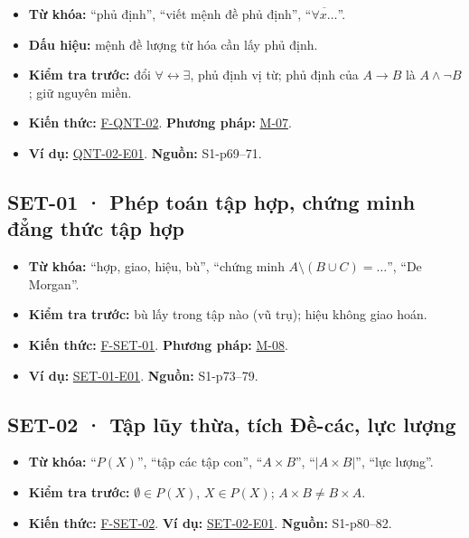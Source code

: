 \documentclass[
  10pt,
  twoside,openany]{book}
\providecommand{\tightlist}{%
  \setlength{\itemsep}{0pt}\setlength{\parskip}{0pt}}
\begin{document}
\begin{itemize}
\tightlist
\item
  \textbf{Từ khóa:} ``phủ định'', ``viết mệnh đề phủ định'',
  ``\(\overline{\forall x\dots}\)''.
\item
  \textbf{Dấu hiệu:} mệnh đề lượng từ hóa cần lấy phủ định.
\item
  \textbf{Kiểm tra trước:} đổi \(\forall\leftrightarrow\exists\), phủ
  định vị từ; phủ định của \(A\to B\) là \(A\wedge\neg B\); giữ nguyên
  miền.
\item
  \textbf{Kiến thức:} \protect\hyperlink{F-QNT-02}{F-QNT-02}.
  \textbf{Phương pháp:} \protect\hyperlink{M-07}{M-07}.
\item
  \textbf{Ví dụ:} \protect\hyperlink{QNT-02-E01}{QNT-02-E01}.
  \textbf{Nguồn:} S1-p69--71.
\end{itemize}

\hypertarget{SET-01}{%
\subsection{SET-01 · Phép toán tập hợp, chứng minh đẳng thức tập
hợp}\label{SET-01}}

\begin{itemize}
\tightlist
\item
  \textbf{Từ khóa:} ``hợp, giao, hiệu, bù'', ``chứng minh
  \(A\setminus(B\cup C)=\dots\)'', ``De Morgan''.
\item
  \textbf{Kiểm tra trước:} bù lấy trong tập nào (vũ trụ); hiệu không
  giao hoán.
\item
  \textbf{Kiến thức:} \protect\hyperlink{F-SET-01}{F-SET-01}.
  \textbf{Phương pháp:} \protect\hyperlink{M-08}{M-08}.
\item
  \textbf{Ví dụ:} \protect\hyperlink{SET-01-E01}{SET-01-E01}.
  \textbf{Nguồn:} S1-p73--79.
\end{itemize}

\hypertarget{SET-02}{%
\subsection{SET-02 · Tập lũy thừa, tích Đề-các, lực
lượng}\label{SET-02}}

\begin{itemize}
\tightlist
\item
  \textbf{Từ khóa:} ``\(P(X)\)'', ``tập các tập con'',
  ``\(A\times B\)'', ``\(|A\times B|\)'', ``lực lượng''.
\item
  \textbf{Kiểm tra trước:} \(\emptyset\in P(X)\), \(X\in P(X)\);
  \(A\times B\neq B\times A\).
\item
  \textbf{Kiến thức:} \protect\hyperlink{F-SET-02}{F-SET-02}. \textbf{Ví
  dụ:} \protect\hyperlink{SET-02-E01}{SET-02-E01}. \textbf{Nguồn:}
  S1-p80--82.
\end{itemize}
\end{document}
